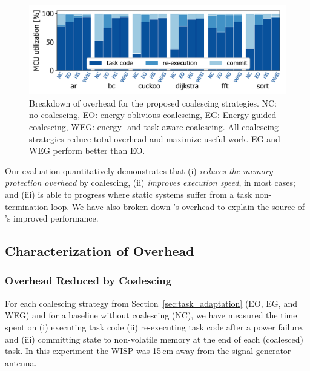 \begin{figure}
	\centering
	\includegraphics[width=\columnwidth]{figures/coalEfficiency}
    \caption{Breakdown of overhead for the proposed coalescing strategies.
NC: no coalescing, EO: energy-oblivious coalescing, EG: Energy-guided coalescing, WEG:
energy- and task-aware coalescing. All coalescing strategies reduce total
overhead and maximize useful work. EG and WEG perform better than EO.}
	\label{fig:overallOverheadBreakdown}
\end{figure}
%
Our evaluation quantitatively demonstrates that \sys (i) \emph{reduces the memory
protection overhead} by coalescing, (ii) \emph{improves execution speed}, in most cases; %
and (iii) \sys is able to progress where static systems suffer from a task non-termination loop. 
We have also broken down \sys's overhead to explain the source of \sys's improved performance.
%
\subsection{Characterization of Overhead}
\label{sec:coala_overhead}

\subsubsection{Overhead Reduced by Coalescing}
\label{sec:overhead-coalescing}

For each coalescing strategy from Section~\ref{sec:task_adaptation} (EO, EG,
and WEG) and for a baseline without coalescing (NC), we have measured the time
spent on (i) executing task code (ii) re-executing task code after a power failure, and
(iii) committing state to non-volatile memory at the end of each (coalesced)
task.  In this experiment the WISP was 15\,cm away from the signal generator
antenna.

